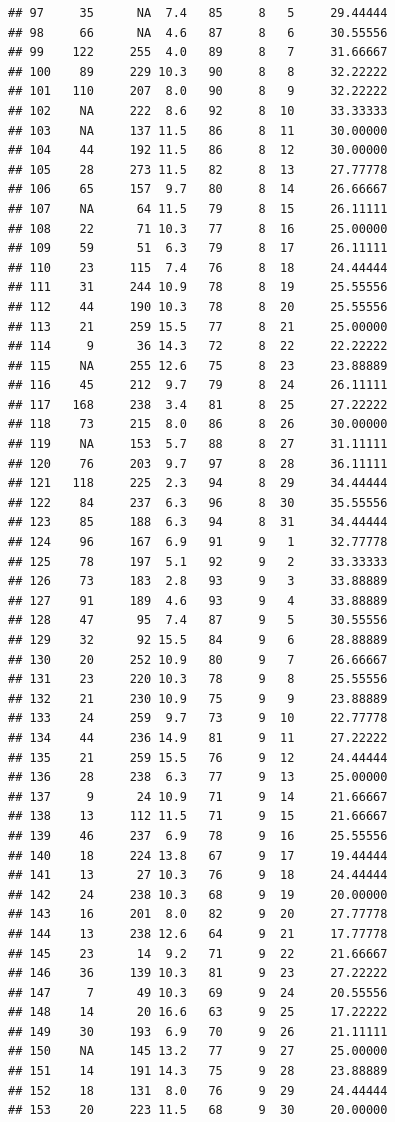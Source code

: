 \documentclass[11pt,]{book}
\begin{document}
\begin{verbatim}
## 97     35      NA  7.4   85     8   5     29.44444
## 98     66      NA  4.6   87     8   6     30.55556
## 99    122     255  4.0   89     8   7     31.66667
## 100    89     229 10.3   90     8   8     32.22222
## 101   110     207  8.0   90     8   9     32.22222
## 102    NA     222  8.6   92     8  10     33.33333
## 103    NA     137 11.5   86     8  11     30.00000
## 104    44     192 11.5   86     8  12     30.00000
## 105    28     273 11.5   82     8  13     27.77778
## 106    65     157  9.7   80     8  14     26.66667
## 107    NA      64 11.5   79     8  15     26.11111
## 108    22      71 10.3   77     8  16     25.00000
## 109    59      51  6.3   79     8  17     26.11111
## 110    23     115  7.4   76     8  18     24.44444
## 111    31     244 10.9   78     8  19     25.55556
## 112    44     190 10.3   78     8  20     25.55556
## 113    21     259 15.5   77     8  21     25.00000
## 114     9      36 14.3   72     8  22     22.22222
## 115    NA     255 12.6   75     8  23     23.88889
## 116    45     212  9.7   79     8  24     26.11111
## 117   168     238  3.4   81     8  25     27.22222
## 118    73     215  8.0   86     8  26     30.00000
## 119    NA     153  5.7   88     8  27     31.11111
## 120    76     203  9.7   97     8  28     36.11111
## 121   118     225  2.3   94     8  29     34.44444
## 122    84     237  6.3   96     8  30     35.55556
## 123    85     188  6.3   94     8  31     34.44444
## 124    96     167  6.9   91     9   1     32.77778
## 125    78     197  5.1   92     9   2     33.33333
## 126    73     183  2.8   93     9   3     33.88889
## 127    91     189  4.6   93     9   4     33.88889
## 128    47      95  7.4   87     9   5     30.55556
## 129    32      92 15.5   84     9   6     28.88889
## 130    20     252 10.9   80     9   7     26.66667
## 131    23     220 10.3   78     9   8     25.55556
## 132    21     230 10.9   75     9   9     23.88889
## 133    24     259  9.7   73     9  10     22.77778
## 134    44     236 14.9   81     9  11     27.22222
## 135    21     259 15.5   76     9  12     24.44444
## 136    28     238  6.3   77     9  13     25.00000
## 137     9      24 10.9   71     9  14     21.66667
## 138    13     112 11.5   71     9  15     21.66667
## 139    46     237  6.9   78     9  16     25.55556
## 140    18     224 13.8   67     9  17     19.44444
## 141    13      27 10.3   76     9  18     24.44444
## 142    24     238 10.3   68     9  19     20.00000
## 143    16     201  8.0   82     9  20     27.77778
## 144    13     238 12.6   64     9  21     17.77778
## 145    23      14  9.2   71     9  22     21.66667
## 146    36     139 10.3   81     9  23     27.22222
## 147     7      49 10.3   69     9  24     20.55556
## 148    14      20 16.6   63     9  25     17.22222
## 149    30     193  6.9   70     9  26     21.11111
## 150    NA     145 13.2   77     9  27     25.00000
## 151    14     191 14.3   75     9  28     23.88889
## 152    18     131  8.0   76     9  29     24.44444
## 153    20     223 11.5   68     9  30     20.00000
\end{verbatim}
\end{document}
